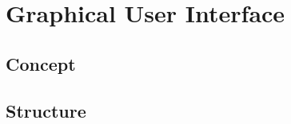 \chapter{Graphical User Interface}
\label{chp:graphical_user_interface}



\section{Concept}
\label{sec:GUI_concept}





\section{Structure}
\label{sec:Structure}



\
